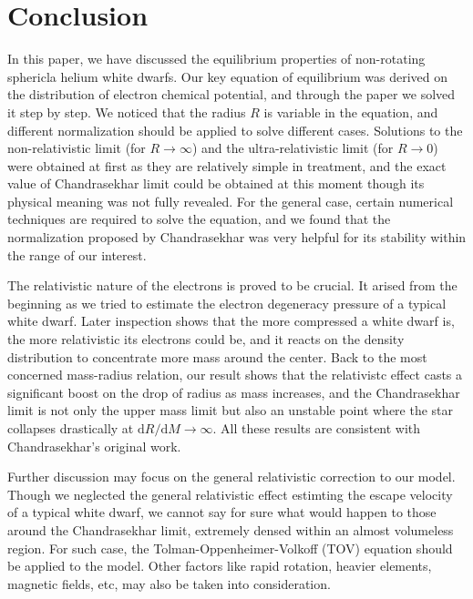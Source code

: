 \documentclass[a4paper,11pt]{article}
\newcommand{\mathdd}{\mathrm{d}}
\numberwithin{equation}{section}
\numberwithin{table}{section}
\numberwithin{figure}{section}
\begin{document}
	
	\section{Conclusion}
		
		In this paper, we have discussed the equilibrium properties of non-rotating sphericla helium white dwarfs. Our key equation of equilibrium was derived on the distribution of electron chemical potential, and through the paper we solved it step by step. We noticed that the radius $R$ is variable in the equation, and different normalization should be applied to solve different cases. Solutions to the non-relativistic limit (for $R\rightarrow\infty$) and the ultra-relativistic limit (for $R\rightarrow0$) were obtained at first as they are relatively simple in treatment, and the exact value of Chandrasekhar limit could be obtained at this moment though its physical meaning was not fully revealed. For the general case, certain numerical techniques are required to solve the equation, and we found that the normalization proposed by Chandrasekhar was very helpful for its stability within the range of our interest. 
		
		The relativistic nature of the electrons is proved to be crucial. It arised from the beginning as we tried to estimate the electron degeneracy pressure of a typical white dwarf. Later inspection shows that the more compressed a white dwarf is, the more relativistic its electrons could be, and it reacts on the density distribution to concentrate more mass around the center. Back to the most concerned mass-radius relation, our result shows that the relativistc effect casts a significant boost on the drop of radius as mass increases, and the Chandrasekhar limit is not only the upper mass limit but also an unstable point where the star collapses drastically at $\mathdd R/\mathdd M\rightarrow\infty$. All these results are consistent with Chandrasekhar's original work.
		
		Further discussion may focus on the general relativistic correction to our model. Though we neglected the general relativistic effect estimting the escape velocity of a typical white dwarf, we cannot say for sure what would happen to those around the Chandrasekhar limit, extremely densed within an almost volumeless region. For such case, the Tolman-Oppenheimer-Volkoff (TOV) equation\cite{1939PhRv...55..374O} should be applied to the model. Other factors like rapid rotation, heavier elements, magnetic fields, etc, may also be taken into consideration.
	
\end{document}
